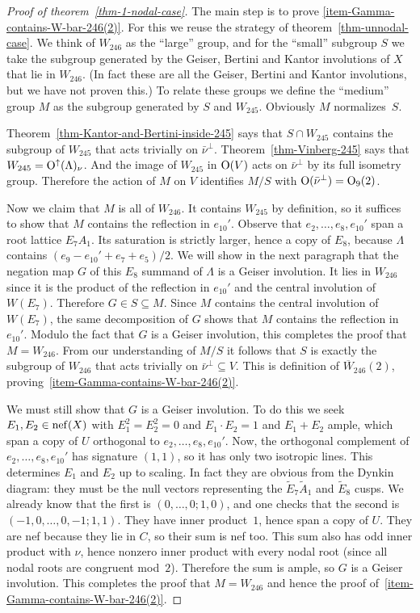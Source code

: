 \documentclass[12pt]{amsart}
\def\nef{\mathop{\rm nef}\nolimits}
\def\Orth{{\rm O}}
\def\Oup{\Orth^{\uparrow}}
\def\nubar{{\bar{\nu}}}
\def\Wbar{\overline{W}}
\def\Atilde{\widetilde{A}}
\def\Etilde{\widetilde{E}}
\def\sset{\subseteq}
\numberwithin{theorem}{section}
\numberwithin{equation}{section}
\numberwithin{figure}{section}
\theoremstyle{remark}
\begin{document}
\begin{proof}[Proof of theorem~\ref{thm-1-nodal-case}]
The main step is to prove \eqref{item-Gamma-contains-W-bar-246(2)}.  For this we reuse the strategy of
theorem~\ref{thm-unnodal-case}.  We think of $W_{246}$ as the ``large'' group, and for
the ``small'' subgroup $S$ we take the subgroup generated by the
Geiser, Bertini and Kantor involutions of $X$ that lie in $W_{246}$.
(In fact these are all the Geiser, Bertini and Kantor involutions, but
we have not proven this.)
To relate these groups we define the ``medium'' group $M$ as the
subgroup generated by $S$ and $W_{245}$.  Obviously $M$ normalizes~$S$.

Theorem~\ref{thm-Kantor-and-Bertini-inside-245} says that $S\cap W_{245}$ contains the subgroup of
$W_{245}$ that acts trivially on $\nubar^\perp$.  Theorem~\ref{thm-Vinberg-245} says that
$W_{245}=\Oup(\Lambda)_\nu$.  And the image of $W_{245}$ in $\Orth(V)$
acts on $\nubar^\perp$ by its full isometry group.  Therefore the
action of $M$ on $V$ identifies $M/S$ with $\Orth(\nubar^\perp)=\Orth_9(2)$.

Now we claim that $M$ is all of $W_{246}$.  It contains $W_{245}$ by
definition, so it suffices to show that $M$ contains the reflection in
$e_{10}'$.  Observe that $e_2,\dots,e_8,e_{10}'$ span a root lattice
$E_7A_1$.  Its saturation is strictly larger, hence a copy of $E_8$,
because $\Lambda$ contains $(e_9-e_{10}'+e_7+e_5)/2$.  We will show in
the next paragraph that the negation map $G$ of this $E_8$ summand of
$\Lambda$ is a Geiser involution.  It lies in $W_{246}$ since it is
the product of the reflection in $e_{10}'$ and the central involution
of $W(E_7)$.  Therefore $G\in S\sset M$.  Since $M$ contains the
central involution of $W(E_7)$, the same decomposition of $G$ shows
that $M$ contains the reflection in $e_{10}'$.
Modulo the fact that $G$ is a Geiser involution,
this
completes the proof that $M=W_{246}$.  From our understanding of
$M/S$ it follows that $S$ is exactly the subgroup of $W_{246}$ that
acts trivially on $\nubar^\perp\sset V$.  This is definition of
$\Wbar_{\!246}(2)$, proving~\eqref{item-Gamma-contains-W-bar-246(2)}.

We must still show that $G$ is a Geiser involution.  To do this we
seek $E_1,E_2\in\nef(X)$ with $E_1^2=E_2^2=0$ and $E_1\cdot E_2=1$ and
$E_1+E_2$ ample, which span a copy of $U$ orthogonal to
$e_2,\dots,e_8,e_{10}'$.  Now, the orthogonal complement of
$e_2,\dots,e_8,e_{10}'$ has signature $(1,1)$, so it has only two
isotropic lines.  This determines $E_1$ and $E_2$  up to scaling.  In fact they are obvious from the
Dynkin diagram: they must be the null vectors representing the
$\Etilde_7\Atilde_1$ and $\Etilde_8$ cusps.  We already know that the
first is $(0,\dots,0;1,0)$, and one checks that the second is
$(-1,0,\dots,0,-1;1,1)$.     They have
inner product~$1$, hence span a copy of $U$.  They are nef because
they lie in $C$, so their  sum is nef too.  This sum also has odd inner product 
with $\nu$, hence nonzero inner product with every nodal root (since
all nodal roots are congruent mod~$2$).  Therefore the sum is ample,
so $G$ is a Geiser involution.
This completes the proof that
$M=W_{246}$ and hence the proof of~\eqref{item-Gamma-contains-W-bar-246(2)}.


\end{proof}
\end{document}
